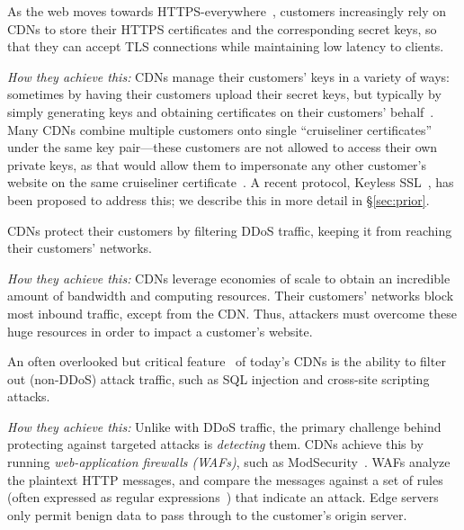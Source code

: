 
%
As the web moves towards
HTTPS-everywhere~\cite{felt-2017-https}, customers increasingly
rely on CDNs to store their HTTPS certificates and the corresponding
secret keys, so that they can accept TLS connections while maintaining
low latency to clients.


\smallskip\noindent
%
\emph{How they achieve this:}
%
CDNs manage their customers' keys in a variety of ways: sometimes
by having their customers upload their secret keys, but typically by
simply generating keys and obtaining certificates on their customers'
behalf~\cite{key-sharing,when-https-meets-cdn}.
%
Many CDNs combine multiple customers onto single ``cruiseliner
certificates'' under the same key pair---these customers are not allowed
to access their own private keys, as that would allow them to
impersonate any other customer's website on the same cruiseliner
certificate~\cite{key-sharing}.
%
A recent protocol, Keyless SSL~\cite{keyless-ssl}, has been proposed
to address this; we describe this in more detail in \S\ref{sec:prior}.


%
CDNs protect their customers by filtering DDoS traffic, keeping it from
reaching their customers' networks.

\smallskip\noindent
%
\emph{How they achieve this:}
%
CDNs leverage economies of scale to obtain an incredible amount of
bandwidth and computing resources.  Their customers' networks block
most inbound traffic, except from the CDN\@.
%
Thus, attackers must overcome these huge resources in order to impact a
customer's website.


%
An often overlooked but critical feature~\cite{securing-cdns} of
today's CDNs is the ability to filter out (non-DDoS) attack traffic,
such as SQL injection and cross-site scripting attacks.


\smallskip\noindent
%
\emph{How they achieve this:}
%
Unlike with DDoS traffic, the primary challenge behind protecting
against targeted attacks is \emph{detecting} them.
%
CDNs achieve this by running \emph{web-application firewalls (WAFs)},
such as ModSecurity~\cite{modsecurity}.
%
WAFs analyze the plaintext HTTP messages, and compare the messages against
a set of rules (often expressed as regular expressions~\cite{owasp})
that indicate an attack.
%
Edge servers only permit benign data to pass through to the customer's
origin server.



